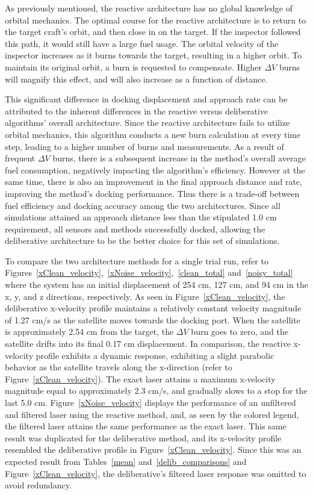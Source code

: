 \documentclass[journal, 10pt]{IEEEtran}
\begin{document}
As previously mentioned, the reactive architecture has no global knowledge of orbital mechanics. The optimal course for the reactive architecture is to return to the target craft's orbit, and then close in on the target. If the inspector followed this path, it would still have a large fuel usage.  The orbital velocity of the inspector increases as it burns towards the target, resulting in a higher orbit.  To maintain its original orbit, a burn is requested to compensate.  Higher $\Delta V$ burns will magnify this effect, and will also increase as a function of distance.

This significant difference in docking displacement and approach rate can be attributed to the inherent differences in the reactive versus deliberative algorithms' overall architecture. Since the reactive architecture fails to utilize orbital mechanics, this algorithm conducts a new burn calculation at every time step, leading to a higher number of burns and measurements. As a result of frequent $\Delta V$ burns, there is a subsequent increase in the method's overall average fuel consumption, negatively impacting the algorithm's efficiency. However at the same time, there is also an improvement in the final approach distance and rate, improving the method's docking performance. Thus there is a trade-off between fuel efficiency and docking accuracy among the two architectures. Since all simulations attained an approach distance less than the stipulated 1.0 cm requirement, all sensors and methods successfully docked, allowing the deliberative architecture to be the better choice for this set of simulations.

To compare the two architecture methods for a single trial run, refer to Figures~\ref{xClean_velocity},~\ref{xNoise_velocity},~\ref{clean_total} and~\ref{noisy_total} where the system has an initial displacement of 254 cm, 127 cm, and 94 cm in the x, y, and z directions, respectively. As seen in Figure~\ref{xClean_velocity}, the deliberative x-velocity profile maintains a relatively constant velocity magnitude of 1.27 cm/s as the satellite moves towards the docking port. When the satellite is approximately 2.54 cm from the target, the $\Delta V$ burn goes to zero, and the satellite drifts into its final 0.17 cm displacement. In comparison, the reactive x-velocity profile exhibits a dynamic response, exhibiting a slight parabolic behavior as the satellite travels along the x-direction (refer to Figure~\ref{xClean_velocity}). The exact laser attains a maximum x-velocity magnitude equal to approximately 2.3 cm/s, and gradually slows to a stop for the last 5.0 cm. Figure~\ref{xNoise_velocity} displays the performance of an unfiltered and filtered laser using the reactive method, and, as seen by the colored legend, the filtered laser attains the same performance as the exact laser. This same result was duplicated for the deliberative method, and its x-velocity profile resembled the deliberative profile in Figure~\ref{xClean_velocity}. Since this was an expected result from Tables~\ref{mean} and~\ref{delib_comparisons} and Figure~\ref{xClean_velocity}, the deliberative's filtered laser response was omitted to avoid redundancy.
\end{document}

